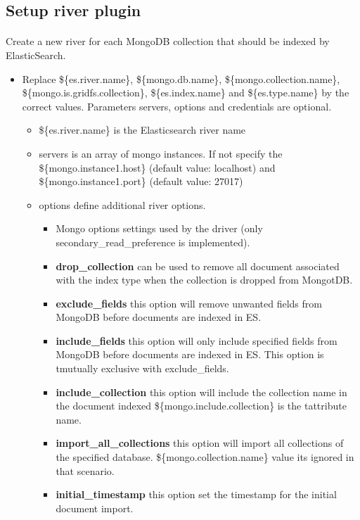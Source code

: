 \documentclass{article}%
\begin{document}
\subsection{Setup river plugin}

\paragraph{} Create a new river for each MongoDB collection that should be indexed by ElasticSearch.

\begin{itemize}
	\item Replace \$\{es.river.name\}, \$\{mongo.db.name\}, \$\{mongo.collection.name\}, \\\$\{mongo.is.gridfs.collection\}, \$\{es.index.name\} and \$\{es.type.name\} by the correct values. Parameters servers, options and credentials are optional.
	\begin{itemize}
		\item \$\{es.river.name\} is the Elasticsearch river name
		\item servers is an array of mongo instances. If not specify the \$\{mongo.instance1.host\} (default value: localhost) and \$\{mongo.instance1.port\} (default value: 27017)
		\item options define additional river options.
		\begin{itemize}
			\item Mongo options settings used by the driver (only secondary\_read\_preference is implemented).
			\item \textbf{drop\_collection} can be used to remove all document associated with the index type when the collection is dropped from MongotDB.
			\item \textbf{exclude\_fields} this option will remove unwanted fields from MongoDB before documents are indexed in ES.
			\item \textbf{include\_fields} this option will only include specified fields from MongoDB before documents are indexed in ES. This option is tmutually exclusive with exclude\_fields.
			\item \textbf{include\_collection} this option will include the collection name in the document indexed \$\{mongo.include.collection\} is the tattribute name.
			\item \textbf{import\_all\_collections} this option will import all collections of the specified database. \$\{mongo.collection.name\} value its ignored in that scenario.
			\item \textbf{initial\_timestamp} this option set the timestamp for the initial document import.

\end{itemize}
\end{itemize}
\end{itemize}
\end{document}
